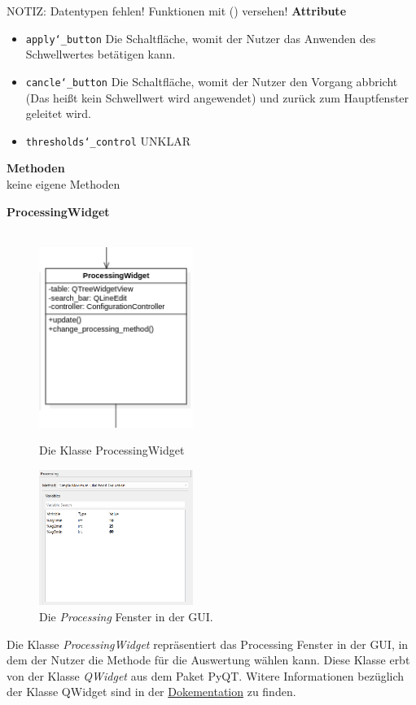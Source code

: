 \documentclass{article}
\begin{document}
NOTIZ: Datentypen fehlen! Funktionen mit () versehen!
\textbf{{Attribute}}
\begin{itemize}
\item \texttt{apply\char`_button} \newline Die Schaltfläche, womit der Nutzer das Anwenden des Schwellwertes betätigen kann.
\item \texttt{cancle\char`_button} \newline Die Schaltfläche, womit der Nutzer den Vorgang abbricht (Das heißt kein Schwellwert wird angewendet) und zurück zum Hauptfenster geleitet wird.
    \item \texttt{thresholds\char`_control} \newline UNKLAR
\end{itemize}

\textbf{{Methoden}}
\\keine eigene Methoden

\newpage
\textbf{\large{ProcessingWidget}}\\\\
\begin{figure}[H]%
    \centering
    \begin{minipage}[b]{0.4\textwidth}
        \includegraphics[width=5cm]{entwurf/Entwurf_dokument/img/Alissa/ProcessingWidget.png}
        \caption{Die Klasse ProcessingWidget}
    \end{minipage}
    \hfill
    \begin{minipage}[b]{0.4\textwidth}
        \includegraphics[width=5cm]{entwurf/Entwurf_dokument/img/Alissa/Processing.png} 
    \caption{Die \textit{Processing} Fenster in der GUI.}
    \end{minipage}
\end{figure}
Die Klasse \textit{ProcessingWidget} repräsentiert das Processing Fenster in der GUI, in dem der Nutzer die Methode für die Auswertung wählen kann. Diese Klasse erbt von der Klasse \textit{QWidget} aus dem Paket PyQT. Witere Informationen bezüglich der Klasse QWidget sind in der \href{https://doc.qt.io/qt-6/qwidget.html}{Dokementation} zu finden.
\newline \newline
\end{document}
